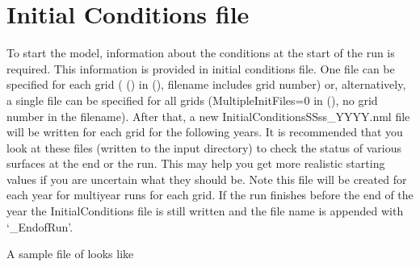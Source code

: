 \documentclass[letterpaper,10pt,english]{sphinxmanual}
\begin{document}
\section{Initial Conditions file}
\label{\detokenize{input_files/Initial_Conditions/Initial_Conditions::doc}}\label{\detokenize{input_files/Initial_Conditions/Initial_Conditions:initial-conditions}}\label{\detokenize{input_files/Initial_Conditions/Initial_Conditions:initial-conditions-file}}
To start the model, information about the conditions at the start of the
run is required. This information is provided in initial conditions
file. One file can be specified for each grid
({\hyperref[\detokenize{input_files/RunControl/File_related_options:cmdoption-arg-multipleinitfiles}]{}} () in
{\hyperref[\detokenize{input_files/RunControl/RunControl:runcontrol-nml}]{}} (), filename includes grid number) or,
alternatively, a single file can be specified for all grids
(MultipleInitFiles=0 in {\hyperref[\detokenize{input_files/RunControl/RunControl:runcontrol-nml}]{}} (), no grid
number in the filename). After that, a new
InitialConditionsSSss\_YYYY.nml file will be written for each grid for
the following years. It is recommended that you look at these files
(written to the input directory) to check the status of various surfaces
at the end or the run. This may help you get more realistic starting
values if you are uncertain what they should be. Note this file will be
created for each year for multiyear runs for each grid. If the run
finishes before the end of the year the InitialConditions file is still
written and the file name is appended with ‘\_EndofRun’.

A sample file of  looks like

%
\begin{sphinxVerbatim}[commandchars=\\\{\}]
\end{sphinxVerbatim}
\end{document}
